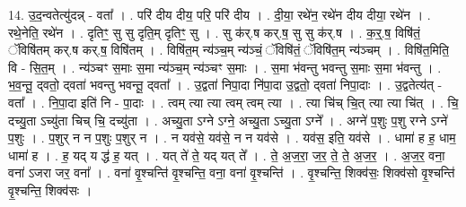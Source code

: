 \documentclass[17pt]{extarticle}
\begin{document}
14. उ॒द॒न्वतेत्यु॑दन्न् - वता᳚ । . परि॑ दीय दीय॒ परि॒ परि॑ दीय । . दी॒या॒ रथे॑न॒ रथे॑न दीय दीया॒ रथे॑न । . रथे॒नेति॒ रथे॑न । . दृतिꣳ॒॒ सु सु दृति॒म् दृतिꣳ॒॒ सु । . सु क॑र्.ष कर्.ष॒ सु सु क॑र्.ष । . क॒र्॒.ष॒ विषि॑तं॒ ॅविषि॑तम् कर्.ष कर्.ष॒ विषि॑तम् । . विषि॑त॒म् न्य॑ञ्च॒म् न्य॑ञ्चं॒ ॅविषि॑तं॒ ॅविषि॑त॒म् न्य॑ञ्चम् । . विषि॑त॒मिति॒ वि - सि॒त॒म् । . न्य॑ञ्चꣳ स॒माः स॒मा न्य॑ञ्च॒म् न्य॑ञ्चꣳ स॒माः । . स॒मा भ॑वन्तु भवन्तु स॒माः स॒मा भ॑वन्तु । . भ॒व॒न्तू॒ द्‍वतो॒ द्‍वता॑ भवन्तु भवन्तू॒ द्‍वता᳚ । . उ॒द्वता॑ निपा॒दा नि॑पा॒दा उ॒द्वतो॒ द्‍वता॑ निपा॒दाः । . उ॒द्वतेत्य॑त् - वता᳚ । . नि॒पा॒दा इति॑ नि - पा॒दाः । . त्वम् त्या त्या त्वम् त्वम् त्या । . त्या चि॑च् चि॒त् त्या त्या चि॑त् । . चि॒ दच्यु॒ता ऽच्यु॑ता चिच् चि॒ दच्यु॑ता । . अच्यु॒ता ऽग्ने ऽग्ने॒ अच्यु॒ता ऽच्यु॒ता ऽग्ने᳚ । . अग्ने॑ प॒शुः प॒शु रग्ने ऽग्ने॑ प॒शुः । . प॒शुर् न न प॒शुः प॒शुर् न । . न यव॑से॒ यव॑से॒ न न यव॑से । . यव॑स॒ इति॒ यव॑से । . धामा॑ ह ह॒ धाम॒ धामा॑ ह । . ह॒ यद् य द्ध॑ ह॒ यत् । . यत् ते॑ ते॒ यद् यत् ते᳚ । . ते॒ अ॒ज॒रा॒ ज॒र॒ ते॒ ते॒ अ॒ज॒र॒ । . अ॒ज॒र॒ वना॒ वना॑ ऽजरा जर॒ वना᳚ । . वना॑ वृ॒श्चन्ति॑ वृ॒श्चन्ति॒ वना॒ वना॑ वृ॒श्चन्ति॑ । . वृ॒श्चन्ति॒ शिक्व॑सः॒ शिक्व॑सो वृ॒श्चन्ति॑ वृ॒श्चन्ति॒ शिक्व॑सः । \newline
\end{document}
